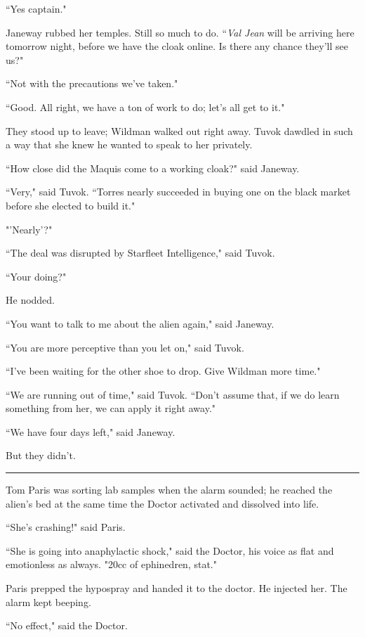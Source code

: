 \documentclass[twoside,letterpaper,12pt]{memoir}
\begin{document}
``Yes captain." 

Janeway rubbed her temples. Still so much to do. ``\textit{Val Jean} will be arriving here tomorrow night, before we have the cloak online. Is there any chance they'll see us?" 

``Not with the precautions we’ve taken." 

``Good. All right, we have a ton of work to do; let's all get to it." 

They stood up to leave; Wildman walked out right away. Tuvok dawdled in such a way that she knew he wanted to speak to her privately. 

``How close did the Maquis come to a working cloak?" said Janeway. 

``Very," said Tuvok. ``Torres nearly succeeded in buying one on the black market before she elected to build it." 

"'Nearly'?" 

``The deal was disrupted by Starfleet Intelligence," said Tuvok. 

``Your doing?" 

He nodded. 

``You want to talk to me about the alien again," said Janeway. 

``You are more perceptive than you let on," said Tuvok. 

``I've been waiting for the other shoe to drop. Give Wildman more time." 

``We are running out of time," said Tuvok. ``Don't assume that, if we do learn something from her, we can apply it right away." 

``We have four days left," said Janeway. 

But they didn't. 

\begin{center}\rule{3cm}{0.4 pt}\end{center} 

Tom Paris was sorting lab samples when the alarm sounded; he reached the alien's bed at the same time the Doctor activated and dissolved into life. 

``She's crashing!" said Paris. 

``She is going into anaphylactic shock," said the Doctor, his voice as flat and emotionless as always. "20cc of ephinedren, stat." 

Paris prepped the hypospray and handed it to the doctor. He injected her. The alarm kept beeping. 

``No effect," said the Doctor. 
\end{document}
